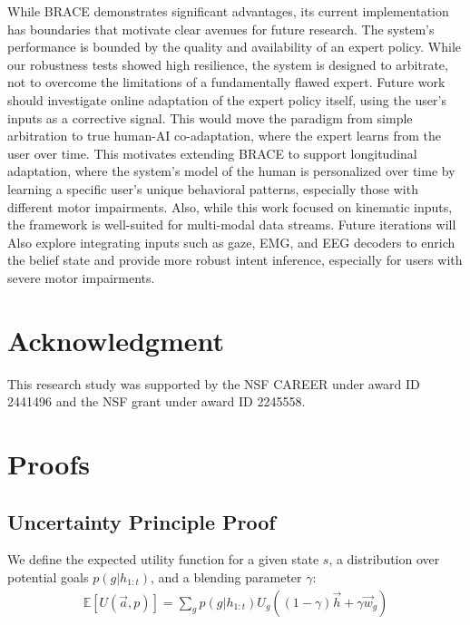 \documentclass[11pt]{article}
\begin{document}
While BRACE demonstrates significant advantages, its current implementation has boundaries that motivate clear avenues for future research. The system's performance is bounded by the quality and availability of an expert policy. While our robustness tests showed high resilience, the system is designed to arbitrate, not to overcome the limitations of a fundamentally flawed expert. Future work should investigate online adaptation of the expert policy itself, using the user's inputs as a corrective signal. This would move the paradigm from simple arbitration to true human-AI co-adaptation, where the expert learns from the user over time. This motivates extending BRACE to support longitudinal adaptation, where the system's model of the human is personalized over time by learning a specific user's unique behavioral patterns, especially those with different motor impairments.
Also, while this work focused on kinematic inputs, the framework is well-suited for multi-modal data streams. Future iterations will Also explore integrating inputs such as gaze, EMG, and EEG decoders to enrich the belief state and provide more robust intent inference, especially for users with severe motor impairments.

\section{Acknowledgment}
This research study was supported by the NSF CAREER under award ID 2441496 and the NSF grant under award ID 2245558. 



\printbibliography

\appendix







\section{Proofs}
\label{sec:appendix_theoretical_analysis}
\subsection{Uncertainty Principle Proof}

We define the expected utility function for a given state $s$, a 
distribution over potential goals $p(g|h_{1:t})$, and a blending 
parameter $\gamma$:
\begin{align}
\mathbb{E}[U(\vec{a}, p)] = \sum_g p(g|h_{1:t}) U_g((1-\gamma)\vec{h} + \gamma\vec{w}_g)
\end{align}
\end{document}
